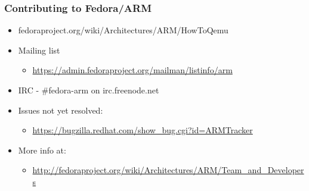 \documentclass[11pt]{beamer}
\begin{document}
\begin{frame}[fragile]\frametitle{Contributing to Fedora/ARM}
\label{sec-5.3}

\begin{itemize}

\item fedoraproject.org/wiki/Architectures/ARM/HowToQemu\\
\label{sec-5.3.1}


\item Mailing list\\
\label{sec-5.3.2}

\begin{itemize}

\item \href{https://admin.fedoraproject.org/mailman/listinfo/arm}{https://admin.fedoraproject.org/mailman/listinfo/arm}\\
\label{sec-5.3.2.1}

\end{itemize} %

\item IRC - \#fedora-arm on irc.freenode.net\\
\label{sec-5.3.3}


\item Issues not yet resolved:\\
\label{sec-5.3.4}

\begin{itemize}

\item \href{https://bugzilla.redhat.com/show_bug.cgi?id=ARMTracker}{https://bugzilla.redhat.com/show\_bug.cgi?id=ARMTracker}\\
\label{sec-5.3.4.1}

\end{itemize} %

\item More info at:\\
\label{sec-5.3.5}

\begin{itemize}

\item \href{http://fedoraproject.org/wiki/Architectures/ARM/Team_and_Developers}{http://fedoraproject.org/wiki/Architectures/ARM/Team\_and\_Developers}\\
\label{sec-5.3.5.1}


\end{itemize} %
\end{itemize} %
\end{frame}
\end{document}
